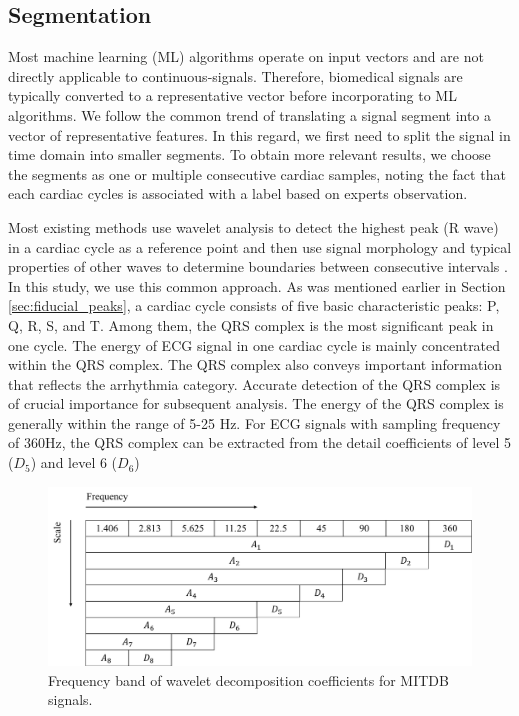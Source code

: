 \subsection{Segmentation}

Most machine learning (ML) algorithms operate on input vectors and are not directly applicable to continuous-signals. Therefore, biomedical signals are typically converted to a representative vector before incorporating to ML algorithms. We follow the common trend of translating a signal segment into a vector of representative features. In this regard, we first need to split the signal in time domain into smaller segments. To obtain more relevant results, we choose the segments as one or multiple consecutive cardiac samples, noting the fact that each cardiac cycles is associated with a label based on experts observation. 

Most existing methods use wavelet analysis to detect the highest peak (R wave) in a cardiac cycle as a reference point and then use signal morphology and typical properties of other waves to determine boundaries between consecutive intervals \textcolor{black}{\cite{banerjee2012delineation,2012qrs,fs,jambukia2015classification}}. In this study, we use this common approach. As was mentioned earlier in Section \ref{sec:fiducial_peaks}, a cardiac cycle consists of five basic characteristic peaks: P, Q, R, S, and T. Among them, the QRS complex is the most significant peak in one cycle. The energy of ECG signal in one cardiac cycle is mainly concentrated within the QRS complex. The QRS complex also conveys important information that reflects the arrhythmia category\cite{2012qrs}. Accurate detection of the QRS complex is of crucial importance for subsequent analysis. The energy of the QRS complex is generally within the range of 5-25 Hz. For ECG signals with sampling frequency of 360Hz, the QRS complex can be extracted from the detail coefficients of level 5 ($D_5$) and level 6 ($D_6$)

\begin{figure}[t]
\centering
\includegraphics[scale=.5]{Fig/scale_wavelet.png}
\caption{Frequency band of wavelet decomposition coefficients for MITDB signals.}
\label{fig:wavelet_decomp}
\end{figure}



